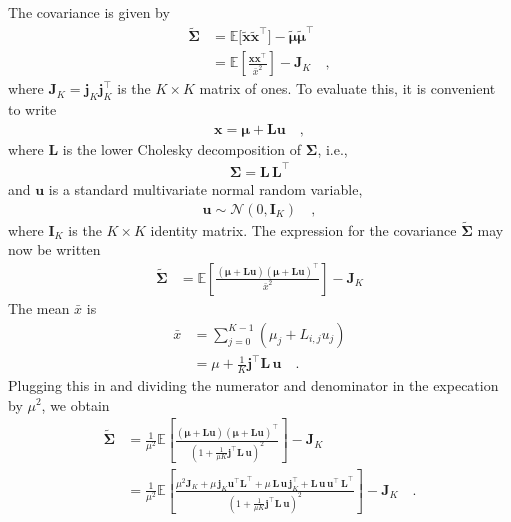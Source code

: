 \documentclass[modern]{aastex62}
\begin{document}
The covariance is given by
%
\begin{align}
    \tilde{\pmb{\Sigma}}
     & =
    \mathbb{E}\big[ \tilde{\mathbf{x}} \tilde{\mathbf{x}}^\top \big]
    - \tilde{\pmb{\mu}}\tilde{\pmb{\mu}}^\top
    \nonumber \\[0.5em]
     & =
    \mathbb{E}\left[ \frac{\mathbf{x}\mathbf{x}^\top}{\bar{x}^2} \right]
    - \mathbf{J}_K
    \quad,
\end{align}
%
where $\mathbf{J}_K = \mathbf{j}_K \mathbf{j}_K^\top$ is the $K\times K$ matrix of ones.
To evaluate this, it is convenient to write
%
\begin{align}
    \mathbf{x} = \pmb{\mu} + \mathbf{L} \mathbf{u}
    \quad,
\end{align}
%
where $\mathbf{L}$ is the lower Cholesky decomposition of $\pmb{\Sigma}$,
i.e.,
%
\begin{align}
    \pmb{\Sigma} = \mathbf{L}\,\mathbf{L}^\top
\end{align}
%
and $\mathbf{u}$ is a standard multivariate normal random variable,
%
\begin{align}
    \mathbf{u} \sim \mathcal{N}\left( 0, \mathbf{I}_K \right)
    \quad,
\end{align}
%
where $\mathbf{I}_K$ is the
$K \times K$ identity matrix.
The expression for the covariance $\tilde{\pmb{\Sigma}}$ may now be written
%
\begin{align}
    \tilde{\pmb{\Sigma}}
     & =
    \mathbb{E}\left[
        \frac{
            (\pmb{\mu} + \mathbf{L} \mathbf{u})(\pmb{\mu} + \mathbf{L} \mathbf{u})^\top
        }{
            \bar{x}^2
        }
        \right]
    - \mathbf{J}_K
\end{align}
%
The mean $\bar{x}$ is
%
\begin{align}
    \bar{x} & = \sum\limits_{j=0}^{K-1}(\mu_j + L_{i,j}u_j)
    \nonumber                                               \\
            & =
    \mu + \frac{1}{K}\mathbf{j}^\top \mathbf{L} \, \mathbf{u}
    \quad.
\end{align}
%
Plugging this in and dividing the numerator and denominator in the expecation
by $\mu^2$, we obtain
%
\begin{align}
    \tilde{\pmb{\Sigma}}
     & =
    \frac{1}{\mu^2}
    \mathbb{E}\left[
        \frac{
            (\pmb{\mu} + \mathbf{L} \mathbf{u})(\pmb{\mu} + \mathbf{L} \mathbf{u})^\top
        }{
            \left(1 + \frac{1}{\mu K}\mathbf{j}^\top \mathbf{L} \, \mathbf{u}\right)^2
        }
        \right]
    - \mathbf{J}_K
    \nonumber \\[0.5em]
     & =
    \frac{1}{\mu^2}
    \mathbb{E}\left[
        \frac{
            \mu^2 \mathbf{J}_K
            +
            \mu \, \mathbf{j}_K\mathbf{u}^\top \mathbf{L}^\top
            +
            \mu \, \mathbf{L} \, \mathbf{u} \, \mathbf{j}_K^\top
            +
            \mathbf{L} \, \mathbf{u} \, \mathbf{u}^\top \, \mathbf{L}^\top
        }{
            \left(1 + \frac{1}{\mu K}\mathbf{j}^\top \mathbf{L} \, \mathbf{u}\right)^2
        }
        \right]
    - \mathbf{J}_K
    \quad.
\end{align}
\end{document}
